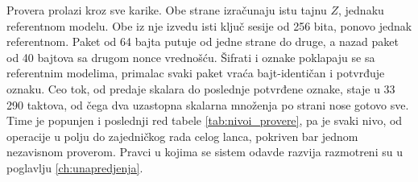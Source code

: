 \smallbreak
Provera prolazi kroz sve karike. Obe strane izračunaju istu tajnu $Z$, jednaku referentnom modelu. Obe iz nje izvedu isti ključ sesije od 256 bita, ponovo jednak referentnom. Paket od 64 bajta putuje od jedne strane do druge, a nazad paket od 40 bajtova sa drugom nonce vrednošću. Šifrati i oznake poklapaju se sa referentnim modelima, primalac svaki paket vraća bajt-identičan i potvrđuje oznaku. Ceo tok, od predaje skalara do poslednje potvrđene oznake, staje u 33\,290 taktova, od čega dva uzastopna skalarna množenja po strani nose gotovo sve. Time je popunjen i poslednji red tabele \ref{tab:nivoi_provere}, pa je svaki nivo, od operacije u polju do zajedničkog rada celog lanca, pokriven bar jednom nezavisnom proverom. Pravci u kojima se sistem odavde razvija razmotreni su u poglavlju \ref{ch:unapredjenja}.
